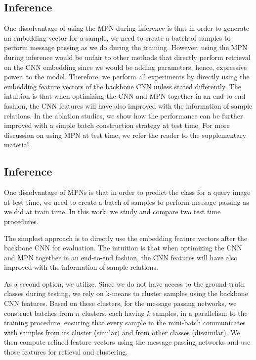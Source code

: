 \documentclass{article}
\begin{document}
\subsection{Inference}
One disadvantage of using the MPN during inference is that in order to generate an embedding vector for a sample, we need to create a batch of samples to perform message passing as we do during the training. 
However, using the MPN during inference would be unfair to other methods that directly perform retrieval on the CNN embedding since we would be adding parameters, hence, expressive power, to the model. Therefore, we perform all experiments by directly using the embedding feature vectors of the backbone CNN unless stated differently. The intuition is that when optimizing the CNN and MPN together in an end-to-end fashion, the CNN features will have also improved with the information of sample relations.
In the ablation studies, we show how the performance can be further improved with a simple batch construction strategy at test time. For more discussion on using MPN at test time, we refer the reader to the supplementary material.


\iffalse
\subsection{Inference}
One disadvantage of MPNs is that in order to predict the class for a query image at test time, we need to create a batch of samples to perform message passing as we did at train time. In this work, we study and compare two test time procedures.

 The simplest approach is to directly use the embedding feature vectors after the backbone CNN for evaluation. The intuition is that when optimizing the CNN and MPN together in an end-to-end fashion, the CNN features will have also improved with the information of sample relations.

\iffalse
{} 
As a second option, we utilize. Since we do not have access to the ground-truth classes during testing, we rely on k-means to cluster samples using the backbone CNN features.
Based on these clusters, for the message passing networks, we construct batches from $n$ clusters, each having $k$ samples, in a parallelism to the training procedure, ensuring that every sample in the mini-batch communicates with samples from its cluster (similar) and from other classes (dissimilar). 
We then compute refined feature vectors using the message passing networks and use those features for retieval and clustering.
\end{document}
